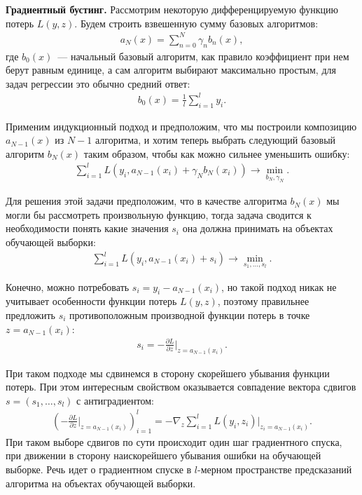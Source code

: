 \documentclass[12pt,a4paper]{article} %
\begin{document}
\textbf{Градиентный бустинг.} Рассмотрим некоторую дифференцируемую функцию потерь $L(y,z)$. Будем строить взвешенную сумму базовых алгоритмов:
\begin{gather}\label{gradbust1}
	a_N(x) = \sum\limits_{n=0}^{N}\gamma_nb_n(x), 
\end{gather}
где $b_0(x)$~--- начальный базовый алгоритм, как правило коэффициент при нем берут равным единице, а сам алгоритм выбирают максимально простым, для задач регрессии это обычно средний ответ:
\begin{gather}\label{gradbust2}
	b_0(x) =  \frac{1}{l}\sum\limits_{i=1}^{l}y_i.
\end{gather}

Применим индукционный подход и предположим, что мы построили композицию $a_{N-1}(x)$ из $N-1$ алгоритма, и хотим теперь выбрать следующий базовый алгоритм $b_N(x)$ таким образом, чтобы как можно сильнее уменьшить ошибку:
\begin{gather}\label{gradbust3}
	\sum\limits_{i=1}^{l}L(y_i, a_{N-1}(x_i)+\gamma_Nb_N(x_i)) \rightarrow \min_{b_N, \gamma_N}.
\end{gather}

Для решения этой задачи предположим, что в качестве алгоритма $b_N(x)$ мы могли бы рассмотреть произвольную функцию, тогда задача сводится к необходимости понять какие значения $s_i$ она должна принимать на  объектах обучающей выборки:
\begin{gather}\label{gradbust4}
	\sum\limits_{i=1}^{l}L(y_i, a_{N-1}(x_i)+s_i) \rightarrow \min_{s_1, \dots, s_l}.
\end{gather}

Конечно, можно потребовать $s_i = y_i-a_{N-1}(x_i)$, но такой подход никак не учитывает особенности функции потерь $L(y,z)$, поэтому правильнее предложить $s_i$ противоположным производной функции потерь в точке $z=a_{N-1}(x_i)$:
\begin{gather}\label{gradbust5}
	s_i = -\frac{\partial L}{\partial z}\bigg|_{z = a_{N-1}(x_i)}.
\end{gather}

При таком подходе мы сдвинемся в сторону скорейшего убывания функции потерь. При этом интересным свойством оказывается совпадение вектора сдвигов $s = (s_1,\dots, s_l)$ с антиградиентом:
\begin{gather}\label{gradbust6}
	\left(-\frac{\partial L}{\partial z}\bigg|_{z = a_{N-1}(x_i)}\right)_{i=1}^{l} = -\nabla_z\sum\limits_{i=1}^{l}L(y_i, z_i)|_{z_i = a_{N-1}(x_i)}.
\end{gather}
При таком выборе сдвигов по сути происходит один шаг градиентного спуска, при движении в сторону наискорейшего убывания ошибки на обучающей выборке. Речь идет о градиентном спуске в $l$-мерном пространстве предсказаний алгоритма на объектах обучающей выборки. 
\end{document}
